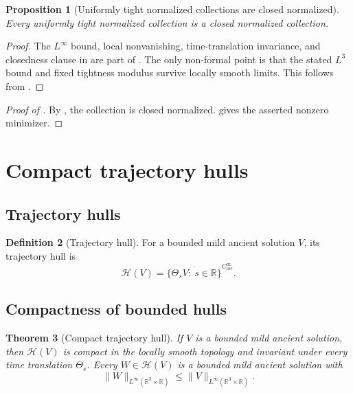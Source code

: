 \documentclass[11pt]{amsart}
\theoremstyle{plain}
\newtheorem{theorem}{Theorem}[section]
\newtheorem{proposition}[theorem]{Proposition}
\theoremstyle{definition}
\newtheorem{definition}[theorem]{Definition}
\theoremstyle{remark}
\numberwithin{equation}{section}
\newcommand{\R}{\mathbb R}
\newcommand{\loc}{\mathrm{loc}}
\newcommand{\calH}{\mathcal H}
\begin{document}
\begin{proposition}[Uniformly tight normalized collections are closed normalized]
\label{prop:tight-closed-normalized}
Every uniformly tight normalized collection is a closed normalized collection.
\end{proposition}

\begin{proof}
The \(L^\infty\) bound, local nonvanishing, time-translation invariance, and
closedness clause in  are part of
.  The only non-formal point is that
the stated \(L^3\) bound and fixed tightness modulus survive locally smooth
limits.  This follows from .
\end{proof}

\begin{proof}[Proof of ]
By , the collection is closed normalized.
 gives the asserted nonzero minimizer.
\end{proof}

\section{Compact trajectory hulls}
\label{sec:compact-hulls}

\subsection{Trajectory hulls}

\begin{definition}[Trajectory hull]\label{def:trajectory-hull}
For a bounded mild ancient solution \(V\), its trajectory hull is
\[
   \calH(V)
   =
   \overline{\{\Theta_sV:\ s\in\R\}}^{C^\infty_{\loc}}.
\]
\end{definition}

\subsection{Compactness of bounded hulls}

\begin{theorem}[Compact trajectory hull]\label{thm:compact-hull}
If \(V\) is a bounded mild ancient solution, then \(\calH(V)\) is compact in
the locally smooth topology and invariant under every time translation
\(\Theta_s\).  Every \(W\in\calH(V)\) is a bounded mild ancient solution with
\[
   \|W\|_{L^\infty(\R^3\times\R)}
   \le
   \|V\|_{L^\infty(\R^3\times\R)}.
\]
\end{theorem}
\end{document}
